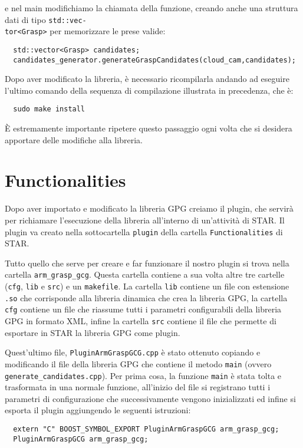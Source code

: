 \documentclass{report}
\begin{document}
e nel main modifichiamo la chiamata della funzione, creando anche una struttura dati di tipo \texttt{std::vec-}\\\texttt{tor<Grasp>} per memorizzare le prese valide:
\begin{verbatim}
  std::vector<Grasp> candidates;
  candidates_generator.generateGraspCandidates(cloud_cam,candidates);
\end{verbatim}
Dopo aver modificato la libreria, è necessario ricompilarla andando ad eseguire l'ultimo comando della sequenza di compilazione illustrata in precedenza, che è: 
\begin{verbatim}
  sudo make install
\end{verbatim}
È estremamente importante ripetere questo passaggio ogni volta che si desidera apportare delle modifiche alla libreria.
\section{Functionalities}
Dopo aver importato e modificato la libreria GPG creiamo il plugin, che servirà per richiamare l'esecuzione della libreria all'interno di un'attività di STAR. Il plugin va creato nella sottocartella \texttt{plugin} della cartella \texttt{Functionalities} di STAR. \par
Tutto quello che serve per creare e far funzionare il nostro plugin si trova nella cartella \texttt{arm\_grasp\_gcg}. Questa cartella contiene a sua volta altre tre cartelle (\texttt{cfg}, \texttt{lib} e \texttt{src}) e un \texttt{makefile}. La cartella \texttt{lib} contiene un file con estensione \texttt{.so} che corrisponde alla libreria dinamica che crea la libreria GPG, la cartella \texttt{cfg} contiene un file che riassume tutti i parametri configurabili della libreria GPG in formato XML, infine la cartella \texttt{src} contiene il file che permette di esportare in STAR la libreria GPG come plugin. \par
Quest'ultimo file, \texttt{PluginArmGraspGCG.cpp} è stato ottenuto copiando e modificando il file della libreria GPG che contiene il metodo \texttt{main} (ovvero \texttt{generate\_candidates.cpp}). Per prima cosa, la funzione \texttt{main} è stata tolta e trasformata in una normale funzione, all'inizio del file si registrano tutti i parametri di configurazione che successivamente vengono inizializzati ed infine si esporta il plugin aggiungendo le seguenti istruzioni: 
\begin{verbatim}
  extern "C" BOOST_SYMBOL_EXPORT PluginArmGraspGCG arm_grasp_gcg;
  PluginArmGraspGCG arm_grasp_gcg;
\end{verbatim}
\end{document}
